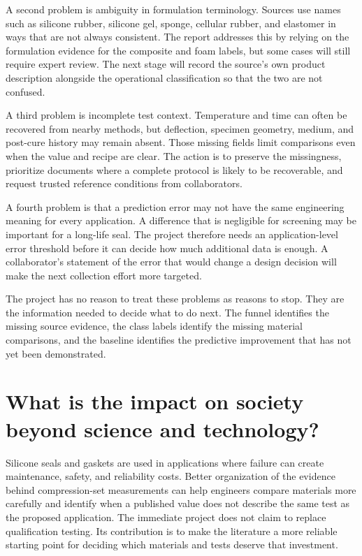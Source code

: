 \documentclass[10pt]{article}
\begin{document}
A second problem is ambiguity in formulation terminology. Sources use names
such as silicone rubber, silicone gel, sponge, cellular rubber, and elastomer
in ways that are not always consistent. The report addresses this by relying
on the formulation evidence for the composite and foam labels, but some cases
will still require expert review. The next stage will record the source's own
product description alongside the operational classification so that the two
are not confused.

A third problem is incomplete test context. Temperature and time can often be
recovered from nearby methods, but deflection, specimen geometry, medium, and
post-cure history may remain absent. Those missing fields limit comparisons even
when the value and recipe are clear. The action is to preserve the missingness,
prioritize documents where a complete protocol is likely to be recoverable,
and request trusted reference conditions from collaborators.

A fourth problem is that a prediction error may not have the same engineering
meaning for every application. A difference that is negligible for screening
may be important for a long-life seal. The project therefore needs an
application-level error threshold before it can decide how much additional
data is enough. A collaborator's statement of the error that would change a
design decision will make the next collection effort more targeted.

The project has no reason to treat these problems as reasons to stop. They are
the information needed to decide what to do next. The funnel identifies the
missing source evidence, the class labels identify the missing material
comparisons, and the baseline identifies the predictive improvement that has
not yet been demonstrated.

\section{What is the impact on society beyond science and technology?}
Silicone seals and gaskets are used in applications where failure can create
maintenance, safety, and reliability costs. Better organization of the
evidence behind compression-set measurements can help engineers compare
materials more carefully and identify when a published value does not describe
the same test as the proposed application. The immediate project does not
claim to replace qualification testing. Its contribution is to make the
literature a more reliable starting point for deciding which materials and
tests deserve that investment.
\end{document}
